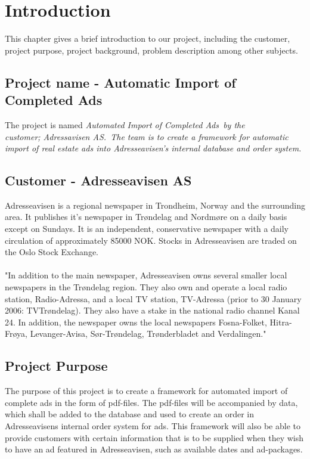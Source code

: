 \chapter{Introduction}
This chapter gives a brief introduction to our project, including the customer, project purpose, project background, problem description among other subjects. 
\newpage

\section{Project name - Automatic Import of Completed Ads}
The project is named \em Automated Import of Completed Ads\em \ by the \\
customer; \em Adressavisen AS.\em \ The team is to create a framework for automatic import of real estate ads into Adresseavisen's internal database and order system.
\section{Customer - Adresseavisen AS}
Adresseavisen is a regional newspaper in Trondheim, Norway and the surrounding area. It publishes it's newspaper in Trøndelag and Nordmøre on a daily basis except on Sundays. It is an independent, conservative newspaper with a daily circulation of approximately 85000 NOK. 
Stocks in Adresseavisen are traded on the Oslo Stock Exchange.\\
\\
"In addition to the main newspaper, Adresseavisen owns several smaller local newspapers in the Trøndelag region. They also own and operate a local radio station, Radio-Adressa, and a local TV station, TV-Adressa (prior to 30 January 2006: TVTrøndelag). They also have a stake in the national radio channel Kanal 24. In addition, the newspaper owns the local newspapers Fosna-Folket, Hitra-Frøya, Levanger-Avisa, Sør-Trøndelag, Trønderbladet and Verdalingen." \cite{adressaWiki}

\section{Project Purpose}
The purpose of this project is to create a framework for automated import of complete ads in the form of pdf-files. The pdf-files will be accompanied by data, which shall be added to the database and used to create an order in Adresseavisens internal order system for ads. This framework will also be able to provide customers with certain information that is to be supplied when they wish to have an ad featured in Adresseavisen, such as available dates and ad-packages.

